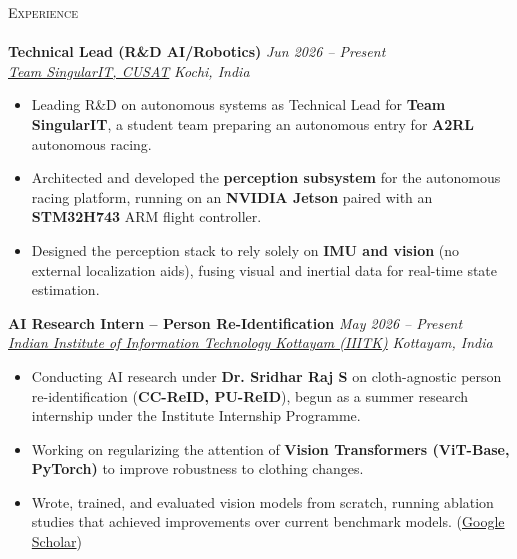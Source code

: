 \documentclass[a4paper]{article}
\newcommand{\lineunder} {
    \vspace*{-8pt} \\
    \hspace*{-18pt} \hrulefill \\
}
\newcommand{\header} [1] {
    {\hspace*{-18pt}\vspace*{6pt} \textsc{#1}}
    \vspace*{-6pt} \lineunder
}
\begin{document}
\header{Experience}
\textbf{Technical Lead (R\&D AI/Robotics)} \hfill \textit{Jun 2026 -- Present} \\
\textit{\href{https://www.teamsingularit.com/}{Team SingularIT, CUSAT}} \hfill \textit{Kochi, India}
\begin{itemize}
    \item Leading R\&D on autonomous systems as Technical Lead for \textbf{Team SingularIT}, a student team preparing an autonomous entry for \textbf{A2RL} autonomous racing.
    \item Architected and developed the \textbf{perception subsystem} for the autonomous racing platform, running on an \textbf{NVIDIA Jetson} paired with an \textbf{STM32H743} ARM flight controller.
    \item Designed the perception stack to rely solely on \textbf{IMU and vision} (no external localization aids), fusing visual and inertial data for real-time state estimation.
\end{itemize}

\textbf{AI Research Intern -- Person Re-Identification} \hfill \textit{May 2026 -- Present} \\
\textit{\href{https://internship.iiitkottayam.ac.in/}{Indian Institute of Information Technology Kottayam (IIITK)}} \hfill \textit{Kottayam, India}
\begin{itemize}
    \item Conducting AI research under \textbf{Dr. Sridhar Raj S} on cloth-agnostic person re-identification (\textbf{CC-ReID, PU-ReID}), begun as a summer research internship under the Institute Internship Programme.
    \item Working on regularizing the attention of \textbf{Vision Transformers (ViT-Base, PyTorch)} to improve robustness to clothing changes.
    \item Wrote, trained, and evaluated vision models from scratch, running ablation studies that achieved improvements over current benchmark models. (\href{https://scholar.google.com/citations?user=dGwfp0wAAAAJ&hl=en}{Google Scholar})
\end{itemize}
\end{document}
